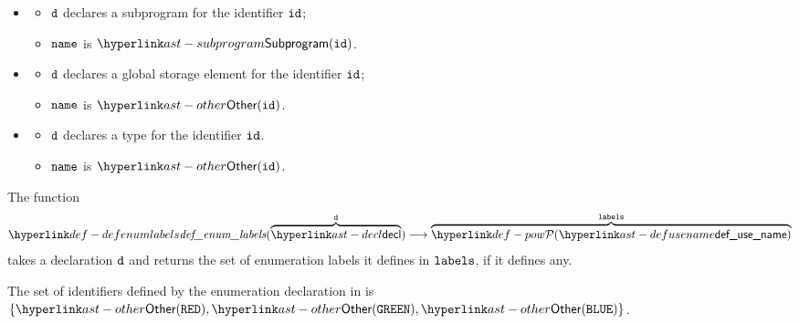 \ProseParagraph
\OneApplies
\begin{itemize}
  \item {}
  \begin{itemize}
    \item $\texttt{d}$ declares a subprogram for the identifier $\texttt{id}$;
    \item $\texttt{name}$ is $\Subprogram(\id)$.
  \end{itemize}

  \item {}
  \begin{itemize}
    \item $\texttt{d}$ declares a global storage element for the identifier $\texttt{id}$;
    \item $\texttt{name}$ is $\Other(\id)$.
  \end{itemize}

  \item {}
  \begin{itemize}
    \item $\texttt{d}$ declares a type for the identifier $\texttt{id}$.
    \item $\texttt{name}$ is $\Other(\id)$.
  \end{itemize}
\end{itemize}

\FormallyParagraph
{}

\hypertarget{def-defenumlabels}{}
The function
\[
\defenumlabels(\overname{\decl}{\vd}) \aslto \overname{\pow{\defusename}}{\vlabels}
\]
takes a declaration $\texttt{d}$ and returns the set of enumeration labels it defines in $\texttt{labels}$,
if it defines any.

The set of identifiers defined by the enumeration declaration
in  is \\
$\{\Other(\RED), \Other(\GREEN), \Other(\BLUE)\}$.

